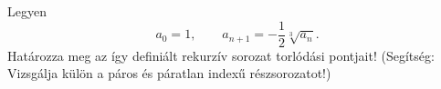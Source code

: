 \documentclass[11pt]{scrartcl}
\begin{document}
Legyen
\[
	a_0 = 1, \qquad a_{n + 1} = -\frac{1}{2} \sqrt[3]{a_n}.
\]
Határozza meg az így definiált rekurzív sorozat torlódási pontjait!
(Segítség: Vizsgálja külön a páros és páratlan indexű részsorozatot!)
\end{document}
